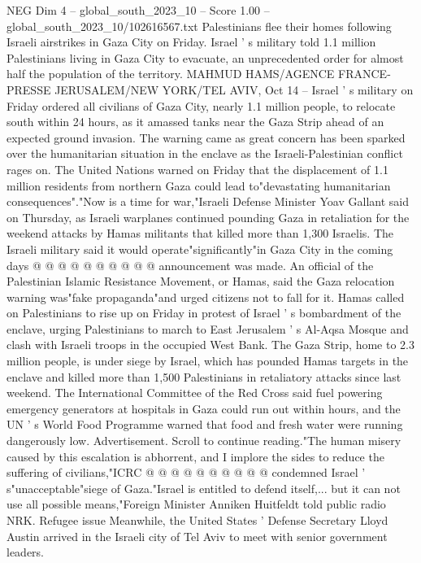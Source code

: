 \begin{textsample}{NEG Dim 4 – global\_south\_2023\_10 – Score 1.00 – global\_south\_2023\_10/102616567.txt}  \label{ex:f4_neg_030}
Palestinians flee their homes following Israeli airstrikes in Gaza City on Friday.
Israel ' s military told 1.1 million Palestinians living in Gaza City to evacuate, an unprecedented order for almost half the population of the territory.
MAHMUD HAMS/AGENCE FRANCE-PRESSE JERUSALEM/NEW YORK/TEL AVIV, Oct 14 -- Israel ' s military on Friday ordered all civilians of Gaza City, nearly 1.1 million people, to relocate south within 24 hours, as it amassed tanks near the Gaza Strip ahead of an expected ground invasion.
The warning came as great concern has been sparked over the humanitarian situation in the enclave as the Israeli-Palestinian conflict rages on.
The United Nations warned on Friday that the displacement of 1.1 million residents from northern Gaza could lead to"devastating humanitarian consequences"."Now is a time for war,"Israeli Defense Minister Yoav Gallant said on Thursday, as Israeli warplanes continued pounding Gaza in retaliation for the weekend attacks by Hamas militants that killed more than 1,300 Israelis.
The Israeli military said it would operate"significantly"in Gaza City in the coming days @ @ @ @ @ @ @ @ @ @ announcement was made.
An official of the Palestinian Islamic Resistance Movement, or Hamas, said the Gaza relocation warning was"fake propaganda"and urged citizens not to fall for it.
Hamas called on Palestinians to rise up on Friday in protest of Israel ' s bombardment of the enclave, urging Palestinians to march to East Jerusalem ' s Al-Aqsa Mosque and clash with Israeli troops in the occupied West Bank.
The Gaza Strip, home to 2.3 million people, is under siege by Israel, which has pounded Hamas targets in the enclave and killed more than 1,500 Palestinians in retaliatory attacks since last weekend.
The International Committee of the Red Cross said fuel powering emergency generators at hospitals in Gaza could run out within hours, and the UN ' s World Food Programme warned that food and fresh water were running dangerously low.
Advertisement.
Scroll to continue reading."The human misery caused by this escalation is abhorrent, and I implore the sides to reduce the suffering of civilians,"ICRC @ @ @ @ @ @ @ @ @ @ condemned Israel ' s"unacceptable"siege of Gaza."Israel is entitled to defend itself,... but it can not use all possible means,"Foreign Minister Anniken Huitfeldt told public radio NRK.
Refugee issue Meanwhile, the United States ' Defense Secretary Lloyd Austin arrived in the Israeli city of Tel Aviv to meet with senior government leaders.

\end{textsample}
